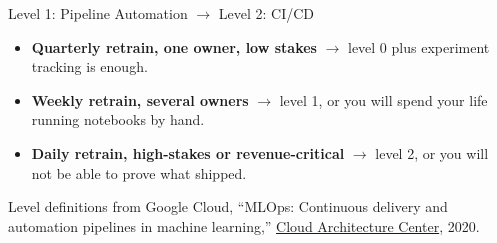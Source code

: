 \begin{frame}{Level 1: Pipeline Automation $\rightarrow$ Level 2: CI/CD}
    \vspace{0.04em}
    \begin{itemize}
        \scriptsize
        \item \textbf{Quarterly retrain, one owner, low stakes} $\rightarrow$ level 0 plus experiment tracking
              is enough.
        \item \textbf{Weekly retrain, several owners} $\rightarrow$ level 1, or you will spend your life
              running notebooks by hand.
        \item \textbf{Daily retrain, high-stakes or revenue-critical} $\rightarrow$ level 2, or you will not be
              able to prove what shipped.
    \end{itemize}

    \vspace{0.03em}
    {\scriptsize Level definitions from Google Cloud, ``MLOps: Continuous delivery and automation pipelines in machine learning,''
    \href{https://cloud.google.com/architecture/mlops-continuous-delivery-and-automation-pipelines-in-machine-learning}{Cloud Architecture Center}, 2020.}

\end{frame}

